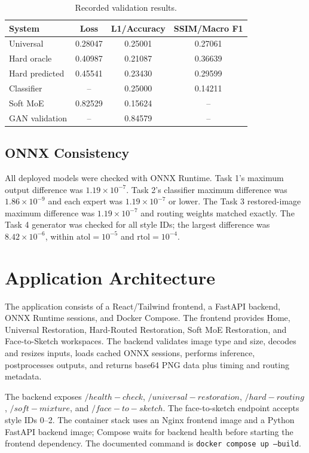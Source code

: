 \documentclass[conference]{IEEEtran}
\begin{document}
\begin{table}[t]
\centering
\caption{Recorded validation results.}
\label{tab:results}
\begin{tabular}{lccc}
\toprule
System & Loss & L1/Accuracy & SSIM/Macro F1 \\
\midrule
Universal & 0.28047 & 0.25001 & 0.27061 \\
Hard oracle & 0.40987 & 0.21087 & 0.36639 \\
Hard predicted & 0.45541 & 0.23430 & 0.29599 \\
Classifier & -- & 0.25000 & 0.14211 \\
Soft MoE & 0.82529 & 0.15624 & -- \\
GAN validation & -- & 0.84579 & -- \\
\bottomrule
\end{tabular}
\end{table}

\subsection{ONNX Consistency}
All deployed models were checked with ONNX Runtime. Task 1's maximum output difference was $1.19\times10^{-7}$. Task 2's classifier maximum difference was $1.86\times10^{-9}$ and each expert was $1.19\times10^{-7}$ or lower. The Task 3 restored-image maximum difference was $1.19\times10^{-7}$ and routing weights matched exactly. The Task 4 generator was checked for all style IDs; the largest difference was $8.42\times10^{-6}$, within $\mathrm{atol}=10^{-5}$ and $\mathrm{rtol}=10^{-4}$.

\section{Application Architecture}
The application consists of a React/Tailwind frontend, a FastAPI backend, ONNX Runtime sessions, and Docker Compose. The frontend provides Home, Universal Restoration, Hard-Routed Restoration, Soft MoE Restoration, and Face-to-Sketch workspaces. The backend validates image type and size, decodes and resizes inputs, loads cached ONNX sessions, performs inference, postprocesses outputs, and returns base64 PNG data plus timing and routing metadata.

The backend exposes $/health-check$, $/universal-restoration$, $/hard-routing$, $/soft-mixture$, and $/face-to-sketch$. The face-to-sketch endpoint accepts style IDs 0--2. The container stack uses an Nginx frontend image and a Python FastAPI backend image; Compose waits for backend health before starting the frontend dependency. The documented command is \texttt{docker compose up --build}.
\end{document}
